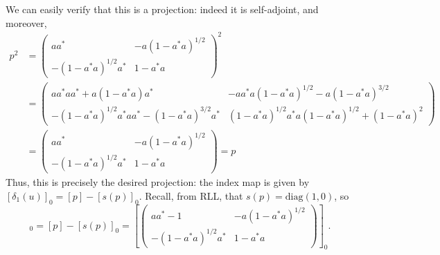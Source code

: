 \documentclass[aps,pra,showpacs,notitlepage,onecolumn,superscriptaddress,nofootinbib]{revtex4-1}
\theoremstyle{definition}
\begin{document}
We can easily verify that this is a projection: indeed it is self-adjoint, and moreover,
\begin{align}
  p^2 &= \begin{pmatrix} a a^{*} & -a(1 - a^{*} a)^{1/2} \\ -(1 - a^{*} a)^{1/2} a^{*} & 1 - a^{*} a \end{pmatrix}^2
  \\ & = \begin{pmatrix} a a^{*} a a^{*} + a(1 - a^{*} a) a^{*} & -aa^{*} a (1 - a^{*} a)^{1/2} - a(1 - a^{*} a)^{3/2} \\ -(1 - a^{*} a)^{1/2} a^{*} a a^{*} - (1 - a^{*} a)^{3/2} a^{*} & (1 - a^{*} a)^{1/2} a^{*} a (1 - a^{*} a)^{1/2} + (1 - a^{*} a)^{2} \end{pmatrix}
  \\ & = \begin{pmatrix} a a^{*} & -a(1 - a^{*} a)^{1/2} \\ -(1 - a^{*} a)^{1/2} a^{*} & 1 - a^{*} a \end{pmatrix} = p
\end{align}
Thus, this is precisely the desired projection: the index map is given by $[\delta_1(u)]_0 = [p] - [s(p)]_0$. Recall, from RLL, that $s(p) = \text{diag}(1, 0)$,
so
\begin{equation}
  [\delta_1(u)]_0 = [p] - [s(p)]_0 = \left[ \begin{pmatrix} a a^{*} - 1 & -a(1 - a^{*} a)^{1/2} \\ -(1 - a^{*} a)^{1/2} a^{*} & 1 - a^{*} a \end{pmatrix} \right]_0.
  \end{equation}
\newline
\end{document}
